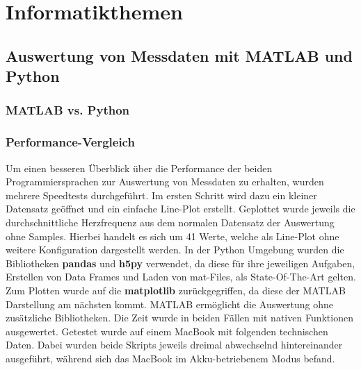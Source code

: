 
\chapter{Informatikthemen}


\section{Auswertung von Messdaten mit MATLAB und Python}



\subsection{MATLAB vs. Python}



\subsection{Performance-Vergleich}

Um einen besseren Überblick über die Performance der beiden Programmiersprachen zur Auswertung von Messdaten zu erhalten, wurden mehrere Speedtests durchgeführt. Im ersten Schritt wird dazu ein kleiner Datensatz geöffnet und ein einfache Line-Plot erstellt. Geplottet wurde jeweils die durchschnittliche Herzfrequenz aus dem normalen Datensatz der Auswertung ohne Samples. Hierbei handelt es sich um 41 Werte, welche als Line-Plot ohne weitere Konfiguration dargestellt werden. In der Python Umgebung wurden die Bibliotheken \textbf{pandas} und \textbf{h5py} verwendet, da diese für ihre jeweiligen Aufgaben, Erstellen von Data Frames und Laden von mat-Files, als State-Of-The-Art gelten. Zum Plotten wurde auf die \textbf{matplotlib} zurückgegriffen, da diese der MATLAB Darstellung am nächsten kommt. MATLAB ermöglicht die Auswertung ohne zusätzliche Bibliotheken. Die Zeit wurde in beiden Fällen mit nativen Funktionen ausgewertet. Getestet wurde auf einem MacBook mit folgenden technischen Daten. Dabei wurden beide Skripts jeweils dreimal abwechselnd hintereinander ausgeführt, während sich das MacBook im Akku-betriebenem Modus befand.

